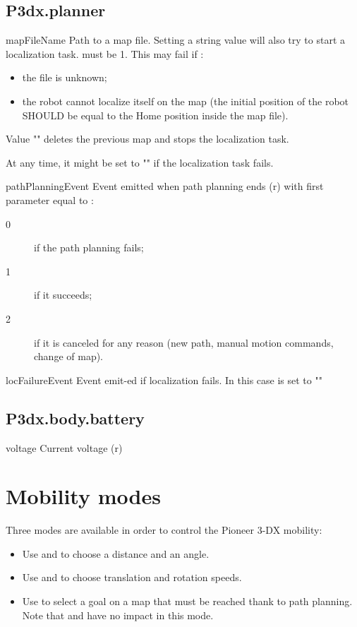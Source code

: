 \subsection{P3dx.planner}
\begin{urbiscriptapi}
\item[mapFileName] Path to a map file. Setting a string value will also try
  to start a localization task.  must be 1. This may fail if
  :
  \begin{itemize}
  \item the file is unknown;
  \item the robot cannot localize itself on the map (the initial position of
    the robot SHOULD be equal to the Home position inside the map file).
  \end{itemize}

  Value "" deletes the previous map and stops the localization task.

  At any time, it might be set to "" if the localization task fails.


\item[pathPlanningEvent] Event emitted when path planning ends (r) with first
  parameter equal to :
  \begin{description}
  \item[0] if the path planning fails;
  \item[1] if it succeeds;
  \item[2] if it is canceled for any reason (new path, manual motion
    commands, change of map).
  \end{description}

\item[locFailureEvent] Event emit-ed if localization fails. In this case
   is set to ""
\end{urbiscriptapi}

\subsection{P3dx.body.battery}
\begin{urbiscriptapi}
\item[voltage] Current voltage (r)
\end{urbiscriptapi}

\section{Mobility modes}
Three modes are available in order to control the Pioneer 3-DX mobility:
\begin{itemize}
\item Use  and  to choose a distance and an angle.
\item Use  and  to choose translation and
  rotation speeds.
\item Use  to select a goal on a map that must be reached thank
  to path planning. Note that  and  have no
  impact in this mode.
\end{itemize}


